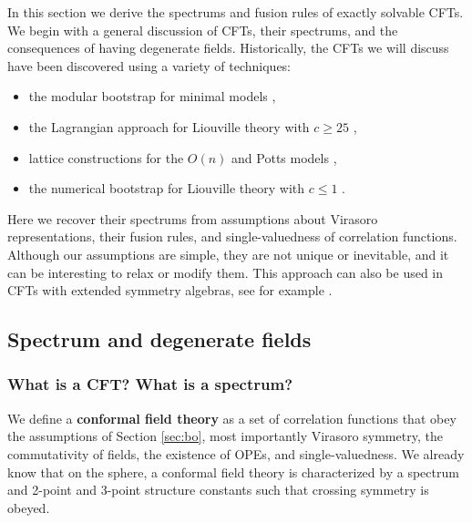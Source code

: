 \documentclass[12pt, a4paper]{article}
\newcommand{\myindex}[1]{\textbf{\boldmath #1}}
\begin{document}
In this section we derive the spectrums and fusion rules of exactly solvable CFTs. We begin with a general discussion of CFTs, their spectrums, and the consequences of having degenerate fields. Historically, the CFTs we will discuss have been discovered using a variety of techniques: 
\begin{itemize}
 \item the modular bootstrap for minimal models \cite{fms97},
 \item the Lagrangian approach for Liouville theory with $c\geq 25$ \cite{zz95},
 \item lattice constructions for the $O(n)$ and Potts models \cite{fsz87},
 \item the numerical bootstrap for Liouville theory with $c\leq 1$ \cite{rs15}.
\end{itemize}
Here we recover their spectrums from assumptions about Virasoro representations, their fusion rules, and single-valuedness of correlation functions. Although our assumptions are simple, they are not unique or inevitable, and it can be interesting to relax or modify them. This approach can also be used in CFTs with extended symmetry algebras, see for example \cite{bp24}.

\subsection{Spectrum and degenerate fields}

\subsubsection{What is a CFT? What is a spectrum?}

We define a \myindex{conformal field theory} as a set of correlation functions that obey the assumptions of Section \ref{sec:bo}, most importantly Virasoro symmetry, the commutativity of fields, the existence of OPEs, and single-valuedness. We already know that on the sphere, a conformal field theory is characterized by a spectrum and 2-point and 3-point structure constants such that crossing symmetry is obeyed.
\end{document}
